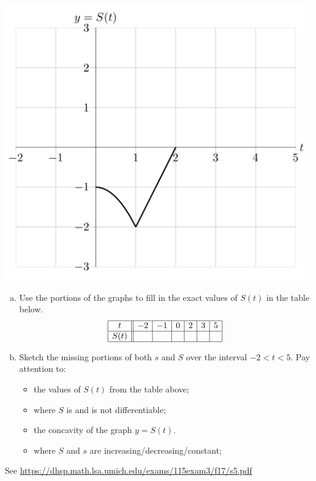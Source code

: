 \documentclass[11pt]{exam}
\begin{document}
\begin{questions}
\begin{multicols}{2}
	\includegraphics[scale=0.39]{Figures/Sgraph}
	\end{multicols}
	\begin{enumerate}[(a)]
		\item Use the portions of the graphs to fill in the exact values of $S(t)$ in the table below.
		$$\begin{array}{|c||c|c|c|c|c|c|c|}
	\hline
	t & -2 & -1 & 0 & 2 & 3 & 5 \\
	\hline
	S(t) & & & & & & \\
	\hline
	\end{array}$$
      \item Sketch the missing portions of both $s$ and $S$ over the interval $-2 < t < 5$. Pay attention to:
\begin{itemize}
\item the values of $S(t)$ from the table above;
\item where $S$ is and is not differentiable;
\item the concavity of the graph $y = S(t)$.
\item where $S$ and $s$ are increasing/decreasing/constant;
\end{itemize}
\end{enumerate}
\begin{solution}
See \href{https://dhsp.math.lsa.umich.edu/exams/115exam3/f17/s5.pdf}{https://dhsp.math.lsa.umich.edu/exams/115exam3/f17/s5.pdf}
\end{solution}

\end{questions}
\end{document}
